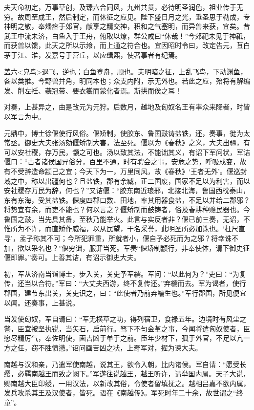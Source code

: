 \documentclass[]{article}
\begin{document}
夫天命初定，万事草创，及臻六合同风，九州共贯，必待明圣润色，祖业传于无穷。故周至成王，然后制定，而休征之应见。陛下盛日月之光，垂圣思于勒成，专神明之敬，奉燔瘗于郊官，献享之精交神，积和之气塞明，而异兽来获，宜矣。昔武王中流未济，白鱼入于王舟，俯取以燎，群公咸曰``休哉！''今郊祀未见于神祇，而获兽以馈，此天之所以示飨，而上通之符合也。宜因昭时令曰，改定告元，苴白茅于江、淮，发嘉号于营丘，以应缉熙，使著事者有纪焉。

盖六\textless{}皃鸟\textgreater{}退飞，逆也；白鱼登舟，顺也。夫明暗之征，上乱飞鸟，下动渊鱼，各以类推。今野兽并角，明同本也；众支内附，示无外也。若此之应，殆将有解编发、削左衽、袭冠带、要衣裳而蒙化者焉。斯拱而俟之耳！

对奏，上甚异之，由是改元为元狩。后数月，越地及匈奴名王有率众来降者，时皆以军言为中。

元鼎中，博士徐偃使行风俗。偃矫制，使胶东、鲁国鼓铸盐铁，还，奏事，徙为太常丞。御史大夫张汤劾偃矫制大害，法至死。偃以为《春秋》之义，大夫出疆，有可以安社稷，存万民，颛之可也。汤以致其法，不能诎其义，有诏下军问状，军诘偃曰：``古者诸侯国异俗分，百里不通，时有聘会之事，安危之势，呼吸成变，故有不受辞造命颛己之宜；今天下为一，万里同风，故《春秋》`王者无外'。偃巡封域之中，称以出疆何也？且盐铁，郡有余臧，正二国废，国家不足以为利害，而以安社稷存万民为辞，何也？''又诘偃：``胶东南近琅邪，北接北海，鲁国西枕泰山，东有东海，受其盐铁。偃度四郡口数、田地，率其用器食盐，不足以并给二郡邪？将势宜有余，而吏不能也？何以言之？偃矫制而鼓铸者，俗及春耕种赡民器也。今鲁国之鼓，当先具其备，至秋乃能举火。此言与实反者非？偃已前三奏，无诏，不惟所为不许，而直矫作威福，以从民望，干名采誉，此明圣所必加诛也。`枉尺直寻'，孟子称其不可；今所犯罪重，所就者小，偃自予必死而为之邪？将幸诛不加，欲以采名也？''偃穷诎，服罪当死。军奏``偃矫制颛行，非奉使体，请下御史征偃即罪。''奏可。上善其诘，有诏示御史大夫。

初，军从济南当诣博士，步入关，关吏予军繻。军问：``以此何为？''吏曰：``为复传，还当以合符。''军曰：``大丈夫西游，终不复传还。''弃繻而去。军为谒者，使行郡国，建节东出关，关吏识之，曰：``此使者乃前弃繻生也。''军行郡国，所见便宜以闻。还奏事，上甚说。

当发使匈奴，军自请曰：``军无横草之功，得列宿卫，食禄五年。边境时有风尘之警，臣宜被坚执锐，当矢石，启前行。驽下不匀金革之事，今闻将遣匈奴使者，臣愿尽精厉气，奉佐明使，画吉凶于单于之前。臣年少材下，孤于外官，不足以亢一方之任，窃不胜愤懑。''诏问画吉凶之状，上奇军对，擢为谏大夫。

南越与汉和亲，乃遣军使南越，说其王，欲令入朝，比内诸侯。军自请：``愿受长缨，必羁南越王而致之阙下。''军遂往说越王，越王听许，请举国内属。天子大说，赐南越大臣印绶，一用汉法，以新改其俗，令使者留填抚之。越相吕嘉不欲内属，发兵攻杀其王及汉使者，皆死。语在《南越传》。军死时年二十余，故世谓之``终童''。
\end{document}

